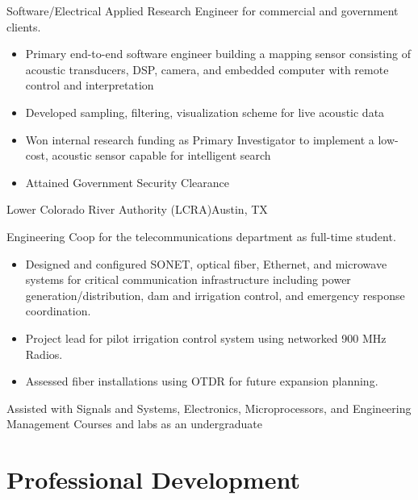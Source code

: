 \documentclass[11pt,a4paper,sans]{moderncv}
\begin{document}
{}{
Software/Electrical Applied Research Engineer for commercial and government clients.  
     \begin{itemize}
        \item Primary end-to-end software engineer building a mapping sensor consisting of acoustic transducers, DSP, camera, and embedded computer with remote control and interpretation 
        \item Developed sampling, filtering, visualization scheme for live acoustic data 
        \item Won internal research funding as Primary Investigator to 
            implement a low-cost, acoustic sensor capable for intelligent search 
        \item Attained Government Security Clearance
    \end{itemize}
         }
            {Lower Colorado River Authority (LCRA)}{Austin, TX}{}
            {Engineering Coop for the telecommunications department 
            as full-time student.
 \begin{itemize}
        \item Designed and configured SONET, optical fiber, Ethernet, and microwave systems
            for critical communication infrastructure including power generation/distribution, dam and 
            irrigation control, and emergency response coordination. 
        \item Project lead for pilot irrigation control system using networked
            900 MHz Radios. 
        \item Assessed fiber installations using OTDR for future expansion planning.
    \end{itemize}
}

{Assisted with Signals and Systems, Electronics, Microprocessors, and 
Engineering Management Courses and labs as an undergraduate}


\section{Professional Development}
\end{document}
